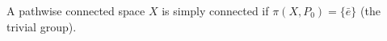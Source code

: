 A pathwise connected space $X$ is simply connected if $\pi(X, P_0) = \{\bar{e}\}$ (the trivial group).
